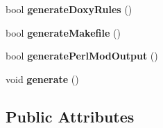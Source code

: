 \begin{DoxyCompactItemize}
bool {\bfseries generate\+Doxy\+Rules} ()
\item 
\mbox{\label{class_perl_mod_generator_a473b6bd63ac2f9ea9fe6de4f8170194b}} 
bool {\bfseries generate\+Makefile} ()
\item 
\mbox{\label{class_perl_mod_generator_a4c5977a4e048326d58cabd7d348463ea}} 
bool {\bfseries generate\+Perl\+Mod\+Output} ()
\item 
\mbox{\label{class_perl_mod_generator_af6bb93beb1eac9b861832d368ffad291}} 
void {\bfseries generate} ()
\end{DoxyCompactItemize}
\subsection*{Public Attributes}
